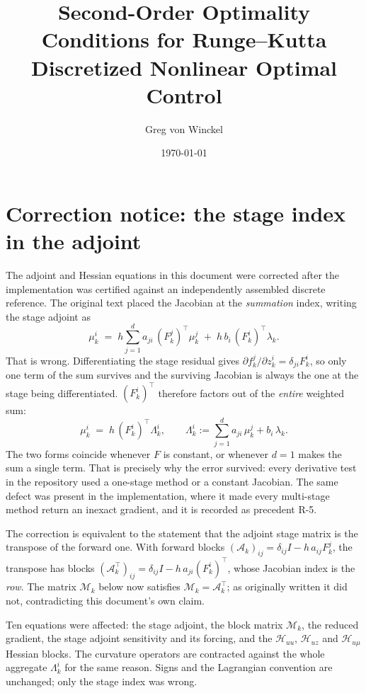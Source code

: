 \documentclass[11pt]{article}
\newcommand{\tp}{^\top}
\begin{document}
\title{Second-Order Optimality Conditions for Runge--Kutta Discretized Nonlinear Optimal Control}
\date{\today}
\author{Greg von Winckel}
\maketitle

\section*{Correction notice: the stage index in the adjoint}

The adjoint and Hessian equations in this document were corrected after the
implementation was certified against an independently assembled discrete
reference. The original text placed the Jacobian at the \emph{summation}
index, writing the stage adjoint as
\[
\mu_k^i \;=\; h\sum_{j=1}^d a_{ji}\,(F_k^j)\tp \mu_k^j \;+\; h\,b_i\,(F_k^i)\tp \lambda_k .
\]
That is wrong. Differentiating the stage residual gives
$\partial f_k^j/\partial z_k^i = \delta_{ji}F_k^i$, so only one term of the
sum survives and the surviving Jacobian is always the one at the stage being
differentiated. $(F_k^i)\tp$ therefore factors out of the \emph{entire}
weighted sum:
\[
\mu_k^i \;=\; h\,(F_k^i)\tp\Lambda_k^i,
\qquad
\Lambda_k^i := \sum_{j=1}^d a_{ji}\,\mu_k^j + b_i\,\lambda_k .
\]
The two forms coincide whenever $F$ is constant, or whenever $d=1$ makes the
sum a single term. That is precisely why the error survived: every derivative
test in the repository used a one-stage method or a constant Jacobian. The
same defect was present in the implementation, where it made every
multi-stage method return an inexact gradient, and it is recorded as
precedent R-5.

The correction is equivalent to the statement that the adjoint stage matrix is
the transpose of the forward one. With forward blocks
$(\mathcal{A}_k)_{ij} = \delta_{ij}I - h\,a_{ij}F_k^j$, the transpose has
blocks $(\mathcal{A}_k\tp)_{ij} = \delta_{ij}I - h\,a_{ji}(F_k^i)\tp$, whose
Jacobian index is the \emph{row}. The matrix $\mathcal{M}_k$ below now
satisfies $\mathcal{M}_k = \mathcal{A}_k\tp$; as originally written it did
not, contradicting this document's own claim.

Ten equations were affected: the stage adjoint, the block matrix
$\mathcal{M}_k$, the reduced gradient, the stage adjoint sensitivity and its
forcing, and the $\mathcal{H}_{uu}$, $\mathcal{H}_{uz}$ and
$\mathcal{H}_{u\mu}$ Hessian blocks. The curvature operators are contracted
against the whole aggregate $\Lambda_k^i$ for the same reason. Signs and the
Lagrangian convention are unchanged; only the stage index was wrong.
\end{document}
